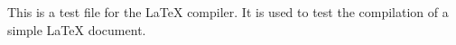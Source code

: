 This is a test file for the LaTeX compiler. It is used to test the compilation of a simple LaTeX document.